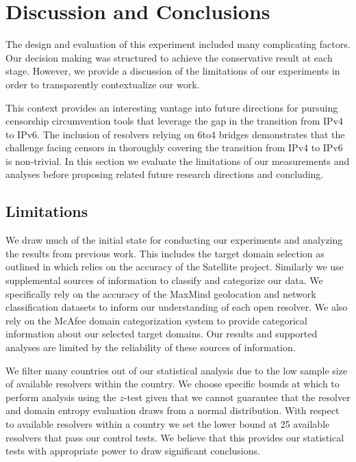 \section{Discussion and Conclusions} \label{sec:discussion}

The design and evaluation of this experiment included many complicating factors.
Our decision making was structured to achieve the conservative result at each
stage. However, we provide a discussion of the limitations of our experiments in
order to transparently contextualize our work.

This context provides an interesting vantage into future directions for pursuing
censorship circumvention tools that leverage the gap in the transition from IPv4
to IPv6. The inclusion of resolvers relying on 6to4 bridges demonstrates that
the challenge facing censors in thoroughly covering the transition from IPv4 to
IPv6 is non-trivial. In this section we evaluate the limitations of our
measurements and analyses before proposing related future research directions
and concluding.

\subsection{Limitations}
\label{sec:discussion:limitations}

We draw much of the initial state for conducting our experiments and analyzing
the results from previous work. This includes the target domain selection as
outlined in  which relies on the accuracy of the
Satellite project. Similarly we use supplemental sources of information to
classify and categorize our data. We specifically rely on the accuracy of the
MaxMind geolocation and network classification datasets to inform our
understanding of each open resolver. We also rely on the McAfee domain
categorization system to provide categorical information about our selected
target domains. Our results and supported analyses are limited by the
reliability of these sources of information.

We filter many countries out of our statistical analysis due to the low sample
size of available resolvers within the country. We choose specific bounds at
which to perform analysis using the $z$-test given that we cannot guarantee that
the resolver and domain entropy evaluation draws from a normal distribution.
With respect to available resolvers within a country we set the lower bound at
25 available resolvers that pass our control tests. We believe that this
provides our statistical tests with appropriate power to draw significant
conclusions.

